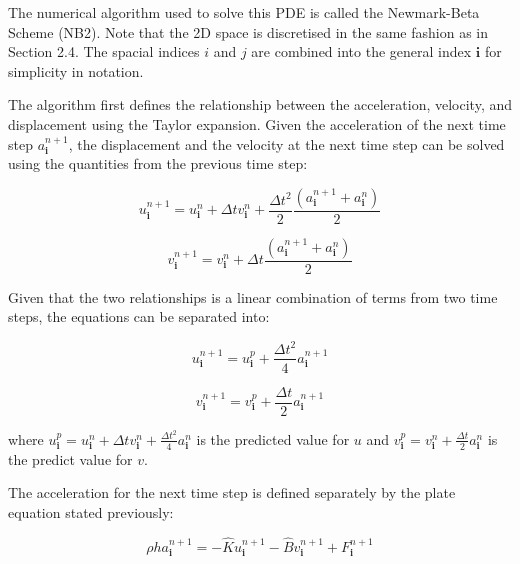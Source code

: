 The numerical algorithm used to solve this PDE is called the Newmark-Beta Scheme (NB2)\autocite{rao2011fem}\autocite{newmark1959method}. Note that the 2D space is discretised in the same fashion as in Section 2.4. The spacial indices $i$ and $j$ are combined into the general index $\mathbf{i}$ for simplicity in notation.

The algorithm first defines the relationship between the acceleration, velocity, and displacement using the Taylor expansion. Given the acceleration of the next time step $a^{n+1}_{\mathbf{i}}$, the displacement and the velocity at the next time step can be solved using the quantities from the previous time step:

\begin{equation}
    u^{n+1}_{\mathbf{i}} = u^{n}_{\mathbf{i}} + \Delta tv^{n}_{\mathbf{i}} + \frac{\Delta t^2}{2}\frac{(a^{n+1}_{\mathbf{i}}+a^{n}_{\mathbf{i}})}{2}
\label{eq:updateu}
\end{equation}

\begin{equation}
    v^{n+1}_{\mathbf{i}} = v^{n}_{\mathbf{i}} + \Delta t \frac{(a^{n+1}_{\mathbf{i}}+a^{n}_{\mathbf{i}})}{2}
\label{eq:updatev}
\end{equation}

Given that the two relationships is a linear combination of terms from two time steps, the equations can be separated into:

\begin{equation}
    u^{n+1}_{\mathbf{i}} = u^{p}_{\mathbf{i}}+ \frac{\Delta t^2}{4}a^{n+1}_{\mathbf{i}}
\end{equation}

\begin{equation}
    v^{n+1}_{\mathbf{i}} = v^{p}_{\mathbf{i}}+\frac{\Delta t}{2} a^{n+1}_{\mathbf{i}}
\end{equation}

where $u^{p}_{\mathbf{i}} = u^{n}_{\mathbf{i}} + \Delta tv^{n}_{\mathbf{i}}+ \frac{\Delta t^2}{4}a^{n}_{\mathbf{i}}$ is the predicted value for $u$ and $v^{p}_{\mathbf{i}} = v^{n}_{\mathbf{i}}+ \frac{\Delta t}{2} a^{n}_{\mathbf{i}}$ is the predict value for $v$.

The acceleration for the next time step is defined separately by the plate equation stated previously:

\begin{equation}
    \rho h a^{n+1}_{\mathbf{i}} = -\hat{K} u^{n+1}_{\mathbf{i}} - \hat{B}v^{n+1}_{\mathbf{i}} + F^{n+1}_{\mathbf{i}}
\end{equation}

